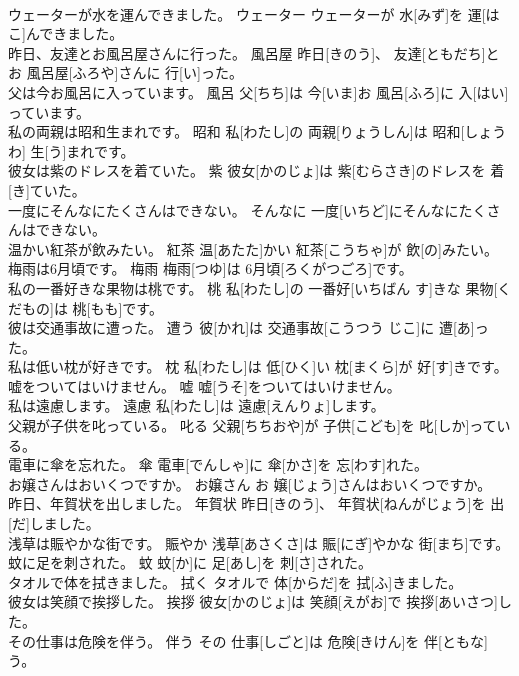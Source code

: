 \documentclass[8pt]{extreport}
\begin{document}
\begin{CJK}{UTF8}{min}
\\	ウェーターが水を運んできました。	ウェーター	ウェーターが 水[みず]を 運[はこ]んできました。	
\\	昨日、友達とお風呂屋さんに行った。	風呂屋	昨日[きのう]、 友達[ともだち]とお 風呂屋[ふろや]さんに 行[い]った。	
\\	父は今お風呂に入っています。	風呂	父[ちち]は 今[いま]お 風呂[ふろ]に 入[はい]っています。	
\\	私の両親は昭和生まれです。	昭和	私[わたし]の 両親[りょうしん]は 昭和[しょうわ] 生[う]まれです。	
\\	彼女は紫のドレスを着ていた。	紫	彼女[かのじょ]は 紫[むらさき]のドレスを 着[き]ていた。	
\\	一度にそんなにたくさんはできない。	そんなに	一度[いちど]にそんなにたくさんはできない。	
\\	温かい紅茶が飲みたい。	紅茶	温[あたた]かい 紅茶[こうちゃ]が 飲[の]みたい。	
\\	梅雨は6月頃です。	梅雨	梅雨[つゆ]は 6月頃[ろくがつごろ]です。	
\\	私の一番好きな果物は桃です。	桃	私[わたし]の 一番好[いちばん す]きな 果物[くだもの]は 桃[もも]です。	
\\	彼は交通事故に遭った。	遭う	彼[かれ]は 交通事故[こうつう じこ]に 遭[あ]った。	
\\	私は低い枕が好きです。	枕	私[わたし]は 低[ひく]い 枕[まくら]が 好[す]きです。	
\\	嘘をついてはいけません。	嘘	嘘[うそ]をついてはいけません。	
\\	私は遠慮します。	遠慮	私[わたし]は 遠慮[えんりょ]します。	
\\	父親が子供を叱っている。	叱る	父親[ちちおや]が 子供[こども]を 叱[しか]っている。	
\\	電車に傘を忘れた。	傘	電車[でんしゃ]に 傘[かさ]を 忘[わす]れた。	
\\	お嬢さんはおいくつですか。	お嬢さん	お 嬢[じょう]さんはおいくつですか。	
\\	昨日、年賀状を出しました。	年賀状	昨日[きのう]、 年賀状[ねんがじょう]を 出[だ]しました。	
\\	浅草は賑やかな街です。	賑やか	浅草[あさくさ]は 賑[にぎ]やかな 街[まち]です。	
\\	蚊に足を刺された。	蚊	蚊[か]に 足[あし]を 刺[さ]された。	
\\	タオルで体を拭きました。	拭く	タオルで 体[からだ]を 拭[ふ]きました。	
\\	彼女は笑顔で挨拶した。	挨拶	彼女[かのじょ]は 笑顔[えがお]で 挨拶[あいさつ]した。	
\\	その仕事は危険を伴う。	伴う	その 仕事[しごと]は 危険[きけん]を 伴[ともな]う。	

\end{CJK}
\end{document}
